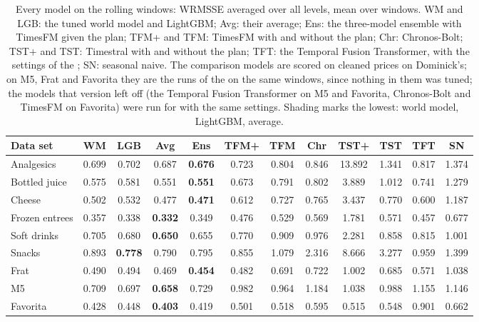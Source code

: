 \begin{table}[t]
\centering\footnotesize\setlength{\tabcolsep}{3pt}
\caption{Every model on the rolling windows: WRMSSE averaged over all levels, mean over windows. WM and LGB: the tuned
world model and LightGBM; Avg: their average; Ens: the three-model ensemble with TimesFM given the plan; TFM+ and
TFM: TimesFM with and without the plan; Chr: Chronos-Bolt; TST+ and TST: Timestral with and without the plan; TFT:
the Temporal Fusion Transformer, with the settings of the \firstver{}; SN: seasonal naive. The comparison models
are scored on cleaned prices on Dominick's; on M5, Frat and Favorita they are the runs of the \firstver{} on the
same windows, since nothing in them was tuned; the models that version left off (the Temporal Fusion Transformer on M5
and Favorita, Chronos-Bolt and TimesFM on Favorita) were run for \thisrev{} with the same settings. Shading marks the lowest: \colorbox{wmcell}{world model}, \colorbox{lgbcell}{LightGBM}, \colorbox{avgcell}{average}.}
\label{tab:sup-comparison}
\begin{adjustbox}{max width=\textwidth}\begin{tabular}{lccccccccccc}
\toprule
Data set & WM & LGB & Avg & Ens & TFM+ & TFM & Chr & TST+ & TST & TFT & SN\\
\midrule
Analgesics & 0.699 & 0.702 & 0.687 & \textbf{0.676} & 0.723 & 0.804 & 0.846 & 13.892 & 1.341 & 0.817 & 1.374 \\
Bottled juice & 0.575 & 0.581 & 0.551 & \textbf{0.551} & 0.673 & 0.791 & 0.802 & 3.889 & 1.012 & 0.741 & 1.279 \\
Cheese & 0.502 & 0.532 & 0.477 & \textbf{0.471} & 0.612 & 0.727 & 0.765 & 3.437 & 0.770 & 0.600 & 1.187 \\
Frozen entrees & 0.357 & 0.338 & \cellcolor{avgcell}\textbf{0.332} & 0.349 & 0.476 & 0.529 & 0.569 & 1.781 & 0.571 & 0.457 & 0.677 \\
Soft drinks & 0.705 & 0.680 & \cellcolor{avgcell}\textbf{0.650} & 0.655 & 0.770 & 0.909 & 0.976 & 2.281 & 0.858 & 0.815 & 1.001 \\
Snacks & 0.893 & \cellcolor{lgbcell}\textbf{0.778} & 0.790 & 0.795 & 0.855 & 1.079 & 2.316 & 8.666 & 3.277 & 0.959 & 1.399 \\
Frat & 0.490 & 0.494 & 0.469 & \textbf{0.454} & 0.482 & 0.691 & 0.722 & 1.002 & 0.685 & 0.571 & 1.038 \\
M5 & 0.709 & 0.697 & \cellcolor{avgcell}\textbf{0.658} & 0.729 & 0.982 & 0.964 & 1.184 & 1.038 & 0.988 & 1.155 & 1.146 \\
Favorita & 0.428 & 0.448 & \cellcolor{avgcell}\textbf{0.403} & 0.419 & 0.501 & 0.518 & 0.595 & 0.515 & 0.548 & 0.901 & 0.662 \\
\bottomrule
\end{tabular}\end{adjustbox}
\end{table}
